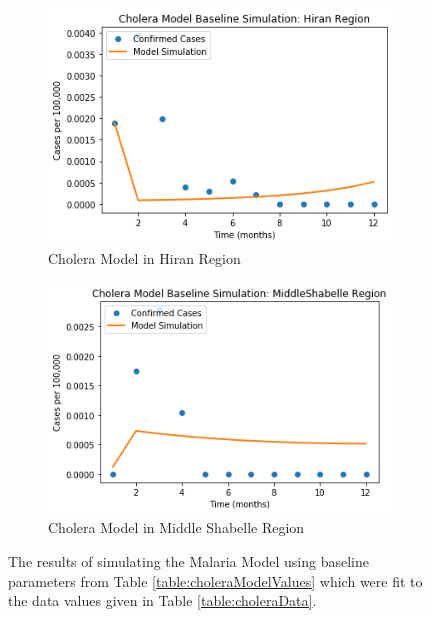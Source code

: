 \documentclass[letter,12pt, usenames,dvipsnames]{article}
\begin{document}
\begin{figure}[h!]
\begin{subfigure}[b]{0.45\textwidth}
     \end{subfigure}
     \hfill
     \begin{subfigure}[b]{0.45\textwidth}
         \centering
         \includegraphics[width=\textwidth]{CholeraHiran.png}
         \caption{Cholera Model in Hiran Region}
     \end{subfigure}
     \hfill
     \begin{subfigure}[b]{0.45\textwidth}
         \centering
         \includegraphics[width=\textwidth]{CholeraMiddleShabelle.png}
         \caption{Cholera Model in Middle Shabelle Region}
     \end{subfigure}
     
        \caption{The results of simulating the Malaria Model using baseline parameters from Table \ref{table:choleraModelValues} which were fit to the data values given in Table \ref{table:choleraData}. }
        \label{fig:CholeraResults}
\end{figure}
\end{document}
